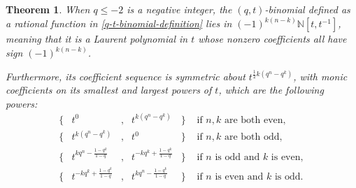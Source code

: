 \documentclass[10pt]{amsart}
\theoremstyle{plain}
\newtheorem{theorem}{Theorem}
\theoremstyle{definition}
\theoremstyle{remark}
\numberwithin{equation}{section}
\newcommand\NN{\mathbb{N}}
\begin{document}
\begin{theorem}
\label{lastthm}
When $q\le -2$ is a negative integer, the $(q,t)$-binomial
defined as a rational function in \eqref{q-t-binomial-definition}
lies in $(-1)^{k(n-k)} \NN[t,t^{-1}]$, meaning that
it is a Laurent polynomial in $t$ whose nonzero
coefficients all have sign $(-1)^{k(n-k)}$.

Furthermore, its coefficient sequence is
symmetric about $t^{\frac{1}{2} k(q^n-q^k)}$,
with monic coefficients on its smallest and largest
powers of $t$, which are the following powers:
$$

\begin{array}{rcccll}
\{& t^0 &,& t^{k(q^n-q^k)} &\} & \text{ if }n,k\text{ are both even}, \\
\{& t^{k(q^n-q^k)} &,& t^0 &\} & \text{ if }n,k\text{ are both odd}, \\
\{& t^{kq^n-\frac{1-q^k}{1-q}} &,& t^{-kq^k+\frac{1-q^k}{1-q}} &\} 
   & \text{ if }n\text{ is odd and }k\text{ is even}, \\
\{& t^{-kq^k+\frac{1-q^k}{1-q}} &,& t^{kq^n-\frac{1-q^k}{1-q}} &\}
   & \text{ if }n\text{ is even and }k\text{ is odd}. \\
\end{array}

$$
\end{theorem}
\end{document}
